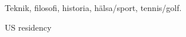 \documentclass[../main.tex]{subfiles}
\begin{document}
{Teknik, filosofi, historia, hälsa/sport, tennis/golf.}

{US residency}
\end{document}
